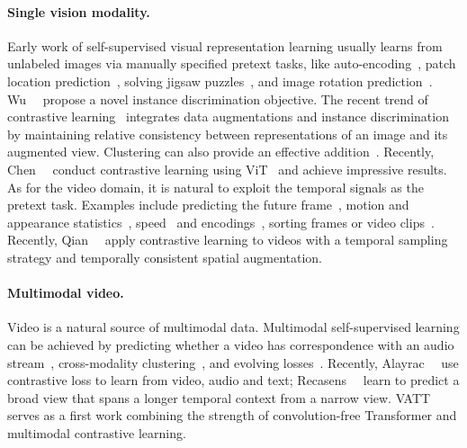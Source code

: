 \documentclass[10pt,twocolumn,letterpaper]{article}
\newcommand{\ours}{VATT\xspace}
\begin{document}
\paragraph{Single vision modality.} 
Early work of self-supervised visual representation learning usually learns from unlabeled images via manually specified pretext tasks, like auto-encoding~\cite{pathak2016context,zhang2016colorful,zhang2017split}, patch location prediction~\cite{doersch2015unsupervised}, solving jigsaw puzzles~\cite{noroozi2016unsupervised}, and image rotation prediction~\cite{gidaris2018unsupervised}. Wu~\etal~\cite{wu2018unsupervised} propose a novel instance discrimination objective. The recent trend of contrastive learning~\cite{moco,simclr,ye2019unsupervised,byol,henaff2019data,tian2019contrastive} integrates data augmentations and instance discrimination by maintaining relative consistency between representations of an image and its augmented view. Clustering can also provide an effective addition~\cite{swav}. 
Recently, Chen~\etal~\cite{chen2021empirical} conduct contrastive learning using ViT~\cite{dosovitskiy2021an} and achieve impressive results.
As for the video domain, it is natural to exploit the temporal signals as the pretext task. Examples include predicting the future frame~\cite{srivastava2015unsupervised}, motion and appearance statistics~\cite{wang2019self}, speed~\cite{benaim2020speednet, wang2020self} and encodings~\cite{lotter2016deep,han2019video,han2020memory}, sorting frames or video clips~\cite{lee2017unsupervised,xu2019self,kim2019self,fernando2017self}. Recently, Qian~\etal~\cite{qian2020spatiotemporal} apply contrastive learning to videos with a temporal sampling strategy and temporally consistent spatial augmentation. 

\paragraph{Multimodal video.} Video is a natural source of multimodal data.
Multimodal self-supervised learning can be achieved by predicting whether a video has correspondence with an audio stream~\cite{arandjelovic2017look,arandjelovic2018objects,morgado2020audio,korbar2018cooperative}, cross-modality clustering~\cite{alwassel2019self}, and evolving losses~\cite{piergiovanni2020evolving}.
Recently, Alayrac~\etal~\cite{mmv} use contrastive loss to learn from video, audio and text; Recasens~\etal~\cite{recasens2021broaden} learn to predict a broad view that spans a longer temporal context from a narrow view. 
\ours serves as a first work combining the strength of convolution-free Transformer and multimodal contrastive learning. 
\end{document}
